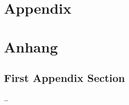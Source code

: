 
{\chapter{Appendix}}    %
{\chapter{Anhang}}      %
\label{chap:appendix}


\section{First Appendix Section}
\label{sec:appendix:FirstSection}
		
		


\dots
